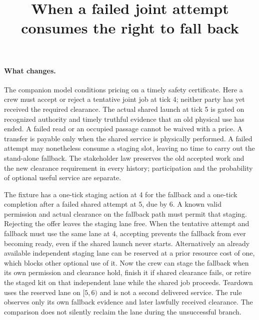 \documentclass{article}
\title{When a failed joint attempt consumes the right to fall back}
\date{}
\begin{document}
\maketitle

\paragraph{What changes.}
The companion model conditions pricing on a timely safety certificate. Here a crew must accept or reject a tentative joint job at tick 4; neither party has yet received the required clearance. The actual shared launch at tick 5 is gated on recognized authority and timely truthful evidence that an old physical use has ended. A failed read or an occupied passage cannot be waived with a price. A transfer is payable only when the shared service is physically performed. A failed attempt may nonetheless consume a staging slot, leaving no time to carry out the stand-alone fallback. The stakeholder law preserves the old accepted work and the new clearance requirement in every history; participation and the probability of optional useful service are separate.

The fixture has a one-tick staging action at 4 for the fallback and a one-tick completion after a failed shared attempt at 5, due by 6. A known valid permission and actual clearance on the fallback path must permit that staging. Rejecting the offer leaves the staging lane free. When the tentative attempt and fallback must use the same lane at 4, accepting prevents the fallback from ever becoming ready, even if the shared launch never starts. Alternatively an already available independent staging lane can be reserved at a prior resource cost of one, which blocks other optional use of it. Now the crew can stage the fallback when its own permission and clearance hold, finish it if shared clearance fails, or retire the staged kit on that independent lane while the shared job proceeds. Teardown uses the reserved lane on $[5,6)$ and is not a second delivered service. The rule observes only its own fallback evidence and later lawfully received clearance. The comparison does not silently reclaim the lane during the unsuccessful branch.
\end{document}
